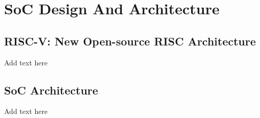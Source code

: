 \documentclass[../main.tex]{subfiles}
\begin{document}
\chapter{SoC Design And Architecture}

\section{RISC-V: New Open-source RISC Architecture}
Add text here

\section{SoC Architecture}
Add text here
\end{document}
